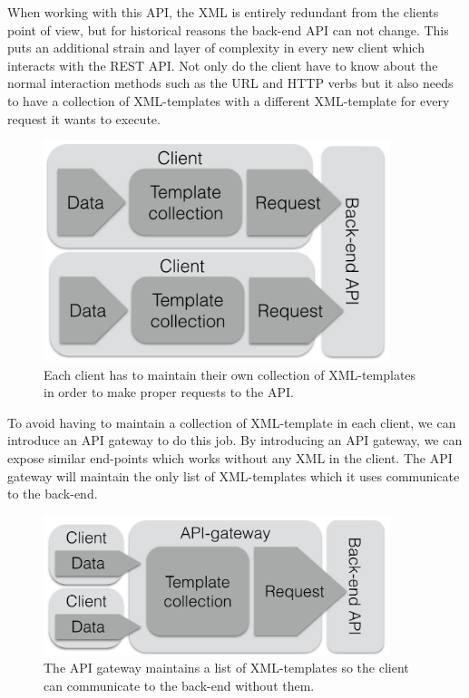 \documentclass{cslthse-msc}
\begin{document}
When working with this API, the XML is entirely redundant from the clients point of view, but for historical reasons the back-end API can not change. This puts an additional strain and layer of complexity in every new client which interacts with the REST API. Not only do the client have to know about the normal interaction methods such as the URL and HTTP verbs but it also needs to have a collection of XML-templates with a different XML-template for every request it wants to execute.

\begin{figure}[H]
  \centering
    \begin{center}
      \includegraphics[width=0.9\textwidth]{images/client_templates.png}
    \end{center}
  \caption{Each client has to maintain their own collection of XML-templates in order to make proper requests to the API.}
\end{figure}

To avoid having to maintain a collection of XML-template in each client, we can introduce an API gateway to do this job. By introducing an API gateway, we can expose similar end-points which works without any XML in the client. The API gateway will maintain the only list of XML-templates which it uses communicate to the back-end.

\begin{figure}[H]
  \centering
    \begin{center}
      \includegraphics[width=0.9\textwidth]{images/gateway_templates.png}
    \end{center}
  \caption{The API gateway maintains a list of XML-templates so the client can communicate to the back-end without them.}
\end{figure}
\end{document}
